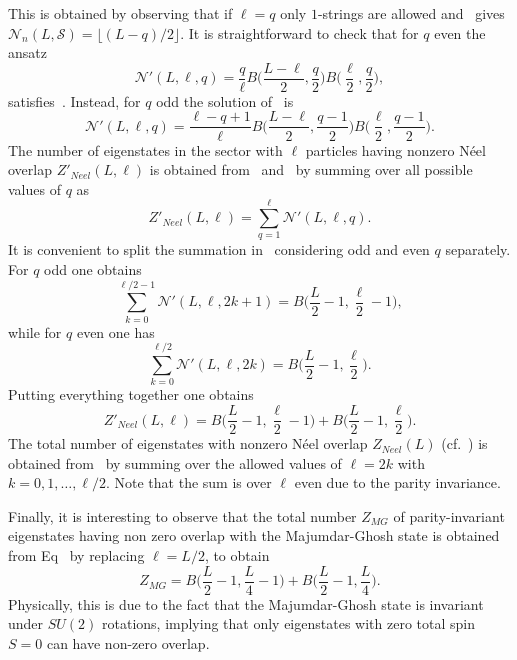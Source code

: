 \documentclass[11pt]{iopart}
\begin{document}
%
This is obtained by observing that if $\ell=q$ only $1$-strings are allowed 
and~ gives ${\mathcal N}_n(L,{\mathcal S})=\lfloor (L-q)/2\rfloor$. 
It is straightforward to check that for $q$ even the ansatz 
%
\begin{equation}
\label{inter1}
{\mathcal N}'(L,\ell,q)=\frac{q}{\ell}B\Big(\frac{L-\ell}{2},\frac{q}{2}\Big)
B\Big(\frac{\ell}{2},\frac{q}{2}\Big),
\end{equation}
% 
satisfies~. Instead, for $q$ odd the solution of~ is 
%
\begin{equation}
\label{inter2}
{\mathcal N}'(L,\ell,q)=\frac{\ell-q+1}{\ell}B\Big(\frac{L-\ell}{2},\frac{q-1}{2}
\Big)B\Big(\frac{\ell}{2},\frac{q-1}{2}\Big).
\end{equation}
%
The number of eigenstates in the sector with $\ell$ particles having nonzero N\'eel 
overlap $Z'_{Neel}(L,\ell)$ is obtained from~ and~ by 
summing over all possible values of $q$ as 
%
\begin{equation}
\label{sum1}
Z'_{Neel}(L,\ell)=\sum\limits_{q=1}^\ell {\mathcal N}'(L,\ell,q).
\end{equation}
%
It is convenient to split the summation in~ considering odd and even 
$q$ separately. For $q$ odd one obtains 
%
\begin{equation}
\sum\limits_{k=0}^{\ell/2-1} {\mathcal N}'(L,\ell,2k+1)=B\Big(\frac{L}{2}-1,
\frac{\ell}{2}-1\Big),
\end{equation}
%
while for $q$ even one has 
%
\begin{equation}
\sum\limits_{k=0}^{\ell/2} {\mathcal N}'(L,\ell,2k)=B\Big(\frac{L}{2}-1,
\frac{\ell}{2}\Big). 
\end{equation}
%
Putting everything together one obtains 
%
\begin{equation}
\label{N-count-p}
Z'_{Neel}(L,\ell)=B\Big(\frac{L}{2}-1,
\frac{\ell}{2}-1\Big)+B\Big(\frac{L}{2}-1,
\frac{\ell}{2}\Big). 
\end{equation}
%
The total number of eigenstates with nonzero N\'eel overlap $Z_{Neel}(L)$ 
(cf.~) is obtained from~ by summing over the allowed 
values of $\ell=2k$ with $k=0,1,\dots,\ell/2$. Note that the sum is over $\ell$ even 
due to the parity invariance. 

Finally, it is interesting to observe that the total number $Z_{MG}$ of parity-invariant 
eigenstates having non zero overlap with the Majumdar-Ghosh state is obtained from 
Eq~ by replacing $\ell=L/2$, to obtain 
%
\begin{equation}
\label{p-inv-mg}
Z_{MG}=B\Big(\frac{L}{2}-1,\frac{L}{4}-1\Big)+B\Big(\frac{L}{2}-1,\frac{L}{4}
\Big). 
\end{equation}
%
Physically, this is due to the fact that the Majumdar-Ghosh state is invariant under 
$SU(2)$ rotations, implying that only eigenstates with zero total spin $S=0$ can have 
non-zero overlap. 
\end{document}
